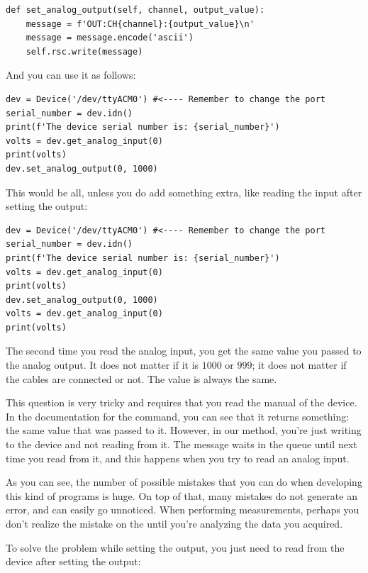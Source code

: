 \begin{verbatim}
def set_analog_output(self, channel, output_value):
    message = f'OUT:CH{channel}:{output_value}\n'
    message = message.encode('ascii')
    self.rsc.write(message)
\end{verbatim}

And you can use it as follows:

\begin{verbatim}
dev = Device('/dev/ttyACM0') #<---- Remember to change the port
serial_number = dev.idn()
print(f'The device serial number is: {serial_number}')
volts = dev.get_analog_input(0)
print(volts)
dev.set_analog_output(0, 1000)
\end{verbatim}

This would be all, unless you do add something extra, like reading the input after setting the output:

\begin{verbatim}
dev = Device('/dev/ttyACM0') #<---- Remember to change the port
serial_number = dev.idn()
print(f'The device serial number is: {serial_number}')
volts = dev.get_analog_input(0)
print(volts)
dev.set_analog_output(0, 1000)
volts = dev.get_analog_input(0)
print(volts)
\end{verbatim}

The second time you read the analog input, you get the same value you passed to the analog output. It does not matter if it is $1000$ or $999$; it does not matter if the cables are connected or not. The value is always the same.


This question is very tricky and requires that you read the manual of the device. In the documentation for the  command, you can see that it returns something: the same value that was passed to it. However, in our method, you're just writing to the device and not reading from it. The message waits in the queue until next time you read from it, and this happens when you try to read an analog input.

As you can see, the number of possible mistakes that you can do when developing this kind of programs is huge. On top of that, many mistakes do not generate an error, and can easily go unnoticed. When performing measurements, perhaps you don't realize the mistake on the  until you're analyzing the data you acquired.

To solve the problem while setting the output, you just need to read from the device after setting the output:

